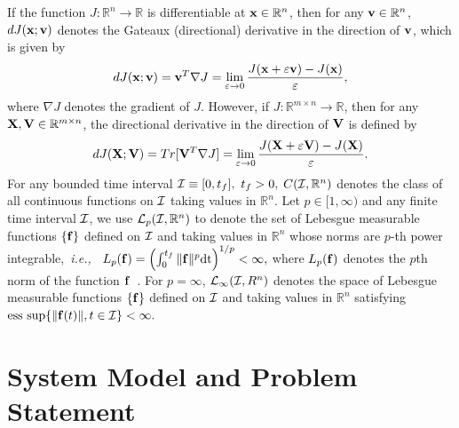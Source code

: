 \documentclass[
12pt,draftcls,onecolumn%
]{IEEEtran}
\begin{document}
If the function $J:\mathbb{R}^n\to \mathbb{R}$ is differentiable at ${\bf x}\in \mathbb{R}^n$, then for any ${\bf v}\in\mathbb{R}^n$, $dJ({\bf x};{\bf v})$ denotes the Gateaux (directional) derivative in the direction of ${\bf v}$, which is given by
%
\begin{equation*}
dJ({\bf x};{\bf v}) = {\bf v}^T\nabla J=\lim_{\varepsilon\to 0} \frac{J({\bf x} + \varepsilon{\bf v}) - J({\bf x})}{\varepsilon}, 
\end{equation*}
where $\nabla J$ denotes the gradient of $J$.
%
However, if $J:\mathbb{R}^{m\times n}\to \mathbb{R}$, then for any ${\bf X},{\bf V}\in\mathbb{R}^{m\times n}$, the directional derivative in the direction of ${\bf V}$ is defined by
\begin{equation*}
dJ({\bf X};{\bf V}) = Tr[{\bf V}^T\nabla J] = \lim_{\varepsilon\to 0} \frac{J({\bf X} + \varepsilon{\bf V}) - J({\bf X})}{\varepsilon}. 
\end{equation*}
For any bounded time interval ${\cal I} \equiv [0, t_f],~t_f>0,$ $C({\cal I},\mathbb{R}^n)$ denotes the class of all continuous functions on ${\cal I}$ taking values in $\mathbb{R}^n$. Let $p \in [1,\infty)$ and  any finite time interval ${\cal I}$, we use  ${\cal L}_p({\cal I},\mathbb{R}^n)$ to denote the set of Lebesgue measurable functions $\{{\bf f}\}$ defined on ${\cal I}$ and taking values in $\mathbb{R}^n$ whose norms are $p$-th power integrable,~\textit{i.e.,}~
$L_p({\bf f}) = \left(\int_{0}^{t_f}\|{\bf f}\|^p \mathrm{dt}\right)^{1/p}<\infty,$ 
%
where $L_p({\bf f})$ denotes the $p$th norm of the function ${\bf f}$~\cite{Royden2010,Khalil2002}. For $p=\infty$, ${\cal L}_{\infty}({\cal I},R^n)$ denotes the space  of Lebesgue measurable functions $\{{\bf f}\}$ defined on ${\cal I}$ and taking values in $\mathbb{R}^n$ satisfying 
%
$\text{ess sup} \{ \|{\bf f}(t)\|, t \in {\cal I}\} < \infty.$
%

\section{System Model and Problem Statement}
\label{sec:systemModel}
\end{document}
